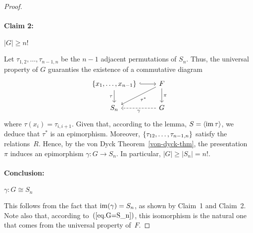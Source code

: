 \begin{proof}
\paragraph{Claim 2:}$|G|\ge n!$

Let $\tau_{1,2},\dots,\tau_{n-1,n}$ be the $n-1$ adjacent permutations of $S_n$. Thus, the universal property of $G$ guaranties the existence of a commutative diagram
\begin{equation}\label{eq.G=S_n}
    \begin{tikzcd}
        {\set{x_1,\dots,x_{n-1}}}
                \arrow[d,"\tau"']
                \arrow[r,hook]
            &F
                \arrow[ld,"\tau^*"]
                \arrow[d,"\pi"]\\
        S_n
            &G
                \arrow[l,dashed,"\gamma"]
    \end{tikzcd}
\end{equation}
where $\tau(x_i)=\tau_{i,i+1}$. Given that, according to the lemma, $S=\langle\operatorname{im}\tau\rangle$, we deduce that $\tau^*$ is an epimorphism. Moreover, $\{\tau_{12},\dots,\tau_{n-1,n}\}$ satisfy the relations~$R$. Hence, by the von Dyck Theorem~\ref{von-dyck-thm}, the presentation $\pi$ induces an epimorphism $\gamma\colon G\to S_n$. In particular, $|G|\ge|S_n|=n!$.

\paragraph{Conclusion:} $\gamma:G\cong S_n$

This follows from the fact that $\operatorname{im}(\gamma)=S_n$, as shown by Claim~1 and Claim~2. Note also that, according to~$(\ref{eq.G=S_n})$, this isomorphism is the natural one that comes from the universal property of~$F$.

\end{proof}

